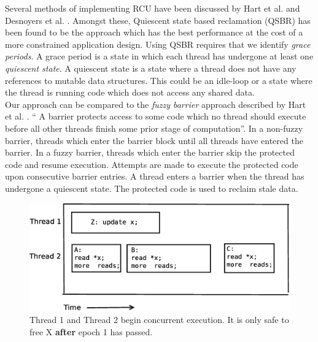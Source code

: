 \documentclass[a4paper,marginparwidth=50pt,marginparsep=10pt]{article}
\begin{document}
Several methods of implementing RCU have been discussed by Hart et al. \cite{hart} and Desnoyers et al. \cite{urcu}. Amongst these, Quiescent state based reclamation (QSBR) has been found to be the approach which has the best performance at the cost of a more constrained application design. Using QSBR requires that we identify \emph{grace periods}. A grace period is a state in which each thread has undergone at least one \emph{quiescent state}. A quiescent state is a state where a thread does not have any references to mutable data structures. This could be an idle-loop or a state where the thread is running code which does not access any shared data.\\

Our approach can be compared to the \emph{fuzzy barrier} approach described by Hart et al. \cite{hart}. `` A barrier protects access to some code which no thread should execute before all other threads finish some prior stage of computation''. In a non-fuzzy barrier, threads which enter the barrier block until all threads have entered the barrier. In a fuzzy barrier, threads which enter the barrier skip the protected code and resume execution. Attempts are made to execute the protected code upon consecutive barrier entries. A thread enters a barrier when the thread has undergone a quiescent state. The protected code is used to reclaim stale data.\\
\begin{figure}[float=tph]
\label{fig:rcuexp1}
\begin{center}
\includegraphics[scale=0.4]{../images/diagrams/rcuexp0}
\caption{Thread 1 and Thread 2 begin concurrent execution. It is only safe to free X  \textbf{after} epoch 1 has passed.}
\end{center}
\end{figure}
\end{document}
